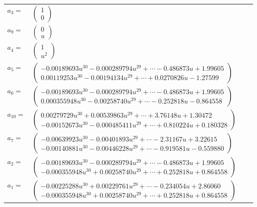 \documentclass[1p]{elsarticle_modified}
\theoremstyle{definition}
\begin{document}
\begin{tabular}{m{7pt} m{180pt} m{7pt} m{180pt} }
\flushright $a_{3}=$&$\begin{pmatrix}1\\0\end{pmatrix}$ \\
\flushright $a_{9}=$&$\begin{pmatrix}0\\u\end{pmatrix}$ \\
\flushright $a_{4}=$&$\begin{pmatrix}1\\u^2\end{pmatrix}$ \\
\flushright $a_{5}=$&$\begin{pmatrix}-0.00189693 u^{30}-0.000289794 u^{29}+\cdots-0.486873 u+1.99605\\0.00119253 u^{30}-0.00194134 u^{29}+\cdots+0.0270826 u-1.27599\end{pmatrix}$ \\
\flushright $a_{6}=$&$\begin{pmatrix}-0.00189693 u^{30}-0.000289794 u^{29}+\cdots-0.486873 u+1.99605\\0.000355948 u^{30}-0.00258740 u^{29}+\cdots-0.252818 u-0.864558\end{pmatrix}$ \\
\flushright $a_{10}=$&$\begin{pmatrix}0.00279729 u^{30}+0.00539863 u^{29}+\cdots+3.76148 u+1.30472\\-0.00152673 u^{30}-0.000485411 u^{29}+\cdots+0.810224 u+0.180328\end{pmatrix}$ \\
\flushright $a_{7}=$&$\begin{pmatrix}-0.00639923 u^{30}-0.00401893 u^{29}+\cdots-2.31167 u+3.22615\\-0.00140881 u^{30}-0.00446228 u^{29}+\cdots-0.919581 u-0.559880\end{pmatrix}$ \\
\flushright $a_{2}=$&$\begin{pmatrix}-0.00189693 u^{30}-0.000289794 u^{29}+\cdots-0.486873 u+1.99605\\-0.000355948 u^{30}+0.00258740 u^{29}+\cdots+0.252818 u+0.864558\end{pmatrix}$ \\
\flushright $a_{1}=$&$\begin{pmatrix}-0.00225288 u^{30}+0.00229761 u^{29}+\cdots-0.234054 u+2.86060\\-0.000355948 u^{30}+0.00258740 u^{29}+\cdots+0.252818 u+0.864558\end{pmatrix}$ \\

\end{tabular}
\end{document}
